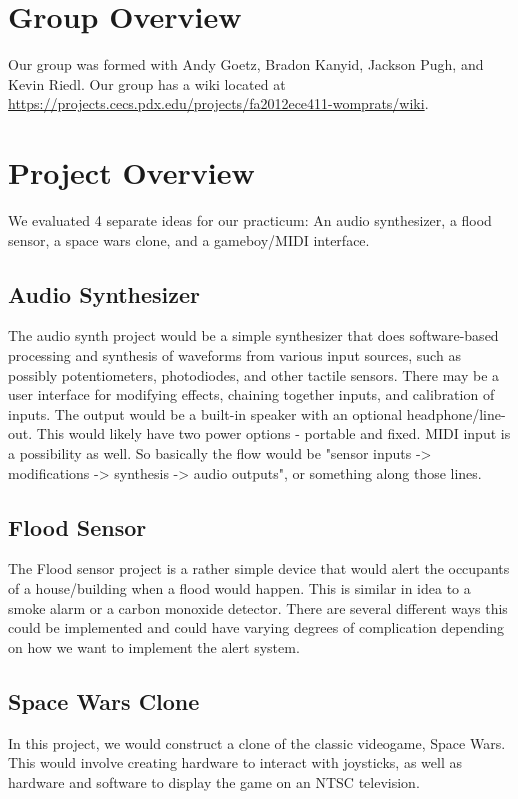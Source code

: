\documentclass{article}
\begin{document}
\newenvironment{frcseries}{\fontfamily{frc}\selectfont}{}
\newcommand{\textfrc}[1]{{\frcseries#1}}
\newcommand{\mathfrc}[1]{\text{\textfrc{#1}}}


\section{Group Overview}
Our group was formed with Andy Goetz, Bradon Kanyid, Jackson Pugh, and
Kevin Riedl. Our group has a wiki located at
\url{https://projects.cecs.pdx.edu/projects/fa2012ece411-womprats/wiki}.
\section{Project Overview}

We evaluated 4 separate ideas for our practicum: An audio synthesizer,
a flood sensor, a space wars clone, and a gameboy/MIDI interface.

\subsection{Audio Synthesizer}
The audio synth project would be a simple synthesizer that does
software-based processing and synthesis of waveforms from various
input sources, such as possibly potentiometers, photodiodes, and other
tactile sensors. There may be a user interface for modifying effects,
chaining together inputs, and calibration of inputs. The output would
be a built-in speaker with an optional headphone/line-out. This would
likely have two power options - portable and fixed. MIDI input is a
possibility as well. So basically the flow would be "sensor inputs ->
modifications -> synthesis -> audio outputs", or something along those
lines.
\subsection{Flood Sensor}
The Flood sensor project is a rather simple device that would alert
the occupants of a house/building when a flood would happen. This is
similar in idea to a smoke alarm or a carbon monoxide detector. There
are several different ways this could be implemented and could have
varying degrees of complication depending on how we want to implement
the alert system.
\subsection{Space Wars Clone}
In this project, we would construct a clone of the classic videogame,
Space Wars. This would involve creating hardware to interact with
joysticks, as well as hardware and software to display the game on an
NTSC television. 
\end{document}
